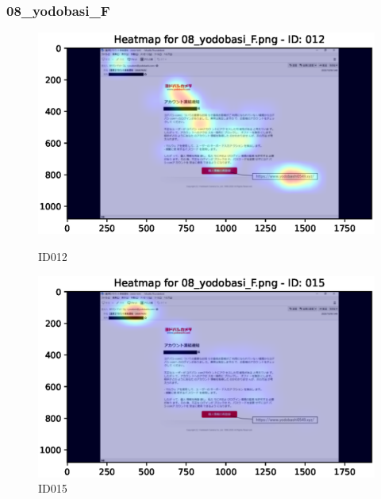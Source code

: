 \documentclass[a4paper,11pt]{ltjsreport}
\begin{document}
\subsubsection{08\_yodobasi\_F}
\begin{figure}[H]
	\centering
	\begin{minipage}[b]{0.49\textwidth}
		\centering
		\includegraphics[width=\linewidth]{img/output/ID012_heatmap_08_yodobasi_F.eps}
		\caption{ID012\label{fig:08012}}
	\end{minipage}
	\begin{minipage}[b]{0.49\textwidth}
		\centering
		\includegraphics[width=\linewidth]{img/output/ID015_heatmap_08_yodobasi_F.eps}
		\caption{ID015\label{fig:08015}}
	\end{minipage}
\end{figure}
\end{document}
